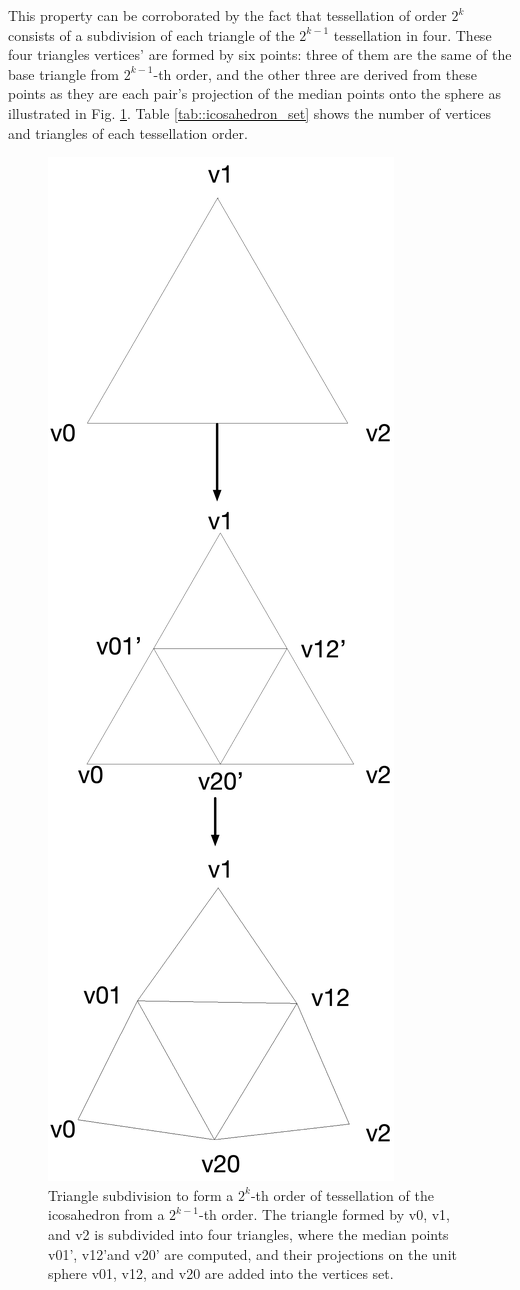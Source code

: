 \documentclass[twoside,twocolumn,10pt]{article}
\begin{document}
This property can be corroborated by the fact that tessellation of order $2^k$ consists of a subdivision of each triangle of the $2^{k-1}$ tessellation in four. These four triangles vertices' are formed by six points: three of them are the same of the base triangle from $2^{k-1}$-th order, and the other three are derived from these points as they are each pair's projection of the median points onto the sphere as illustrated in Fig. \ref{fig::subdivision_icosahedron}. Table \ref{tab::icosahedron_set} shows the number of vertices and triangles of each tessellation order.

\begin{figure}[htb]
    \centering
    \includegraphics[width=.45\linewidth, angle=0]{figs/icosahedron_example/ico_subdivision_V.png}
    \caption{Triangle subdivision to form a $2^k$-th order of tessellation of the icosahedron from a $2^{k-1}$-th order. The triangle formed by v0, v1, and v2 is subdivided into four triangles, where the median points v01', v12'and v20' are computed, and their projections on the unit sphere v01, v12, and v20 are added into the vertices set.
    }
    \label{fig::subdivision_icosahedron}
\end{figure}
\end{document}
